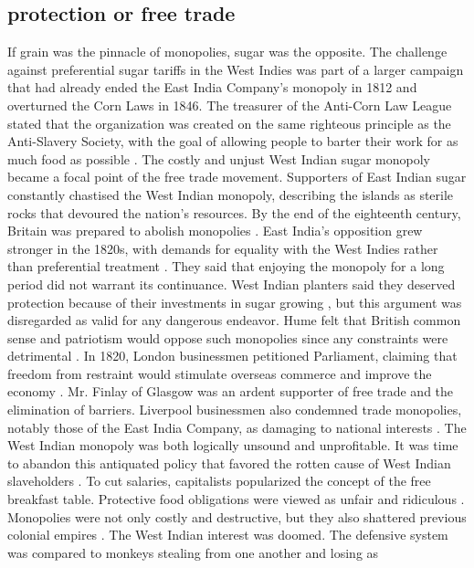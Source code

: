 \subsection{protection or free trade}
If grain was the pinnacle of monopolies, sugar was the opposite. The challenge against preferential sugar tariffs in the West Indies was part of a larger campaign that had already ended the East India Company's monopoly in 1812 and overturned the Corn Laws in 1846. The treasurer of the Anti-Corn Law League stated that the organization was created on the same righteous principle as the Anti-Slavery Society, with the goal of allowing people to barter their work for as much food as possible . The costly and unjust West Indian sugar monopoly became a focal point of the free trade movement. Supporters of East Indian sugar constantly chastised the West Indian monopoly, describing the islands as sterile rocks that devoured the nation's resources. By the end of the eighteenth century, Britain was prepared to abolish monopolies . East India's opposition grew stronger in the 1820s, with demands for equality with the West Indies rather than preferential treatment . They said that enjoying the monopoly for a long period did not warrant its continuance. West Indian planters said they deserved protection because of their investments in sugar growing , but this argument was disregarded as valid for any dangerous endeavor. Hume felt that British common sense and patriotism would oppose such monopolies since any constraints were detrimental . In 1820, London businessmen petitioned Parliament, claiming that freedom from restraint would stimulate overseas commerce and improve the economy . Mr. Finlay of Glasgow was an ardent supporter of free trade and the elimination of barriers. Liverpool businessmen also condemned trade monopolies, notably those of the East India Company, as damaging to national interests . The West Indian monopoly was both logically unsound and unprofitable. It was time to abandon this antiquated policy that favored the rotten cause of West Indian slaveholders . To cut salaries, capitalists popularized the concept of the free breakfast table. Protective food obligations were viewed as unfair and ridiculous . Monopolies were not only costly and destructive, but they also shattered previous colonial empires . The West Indian interest was doomed. The defensive system was compared to monkeys stealing from one another and losing as 